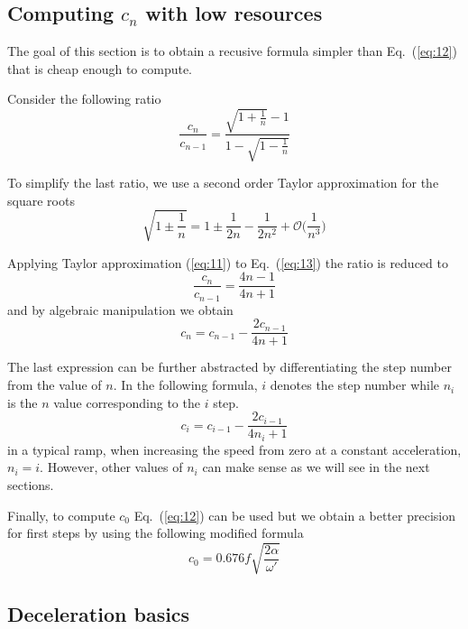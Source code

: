 \documentclass[a4paper]{article}
\begin{document}
\subsection{Computing $c_n$ with low resources}

The goal of this section is to obtain a recusive formula simpler than
Eq.~(\ref{eq:12}) that is cheap enough to compute.

Consider the following ratio
\begin{equation}
  \label{eq:13}
  \frac{c_n}{c_{n-1}} = \frac{\sqrt{1+\frac{1}{n}}-1}{1-\sqrt{1-\frac{1}{n}}}  
\end{equation}

To simplify the last ratio, we use a second order Taylor approximation
for the square roots
\begin{equation}
  \label{eq:11}
  \sqrt{1\pm\frac{1}{n}} = 1\pm\frac{1}{2n}-\frac{1}{2n^2}
                           +\mathcal{O}\bigg(\frac{1}{n^3}\bigg)  
\end{equation}

Applying Taylor approximation (\ref{eq:11}) to Eq.~(\ref{eq:13}) the
ratio is reduced to
\begin{equation}
  \label{eq:14}
  \frac{c_n}{c_{n-1}} = \frac{4n-1}{4n+1}  
\end{equation}
and by algebraic manipulation we obtain
\begin{equation*}
  c_n = c_{n-1} - \frac{2c_{n-1}}{4n+1}  
\end{equation*}

The last expression can be further abstracted by differentiating the
step number from the value of $n$. In the following formula, $i$
denotes the step number while $n_i$ is the $n$ value corresponding to
the $i$ step. 
\begin{equation}
  \label{eq:16}
  c_i = c_{i-1} - \frac{2c_{i-1}}{4n_i + 1}  
\end{equation}
in a typical ramp, when increasing the speed from zero at a constant
acceleration, $n_i=i$. However, other values of $n_i$ can
make sense as we will see in the next sections.

Finally, to compute $c_0$ Eq.~(\ref{eq:12}) can be used but we obtain
a better precision for first steps by using the following modified
formula
\begin{equation}
  \label{eq:17}
  c_0 = 0.676 f \sqrt{\frac{2\alpha}{\omega'}}  
\end{equation}


\subsection{Deceleration basics}
\end{document}
